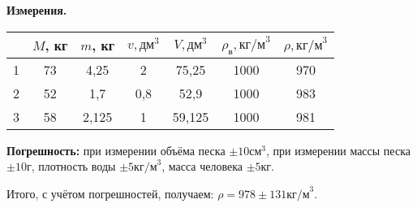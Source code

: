\begin{center}
  \textbf{Измерения.}  
\end{center}
\begin{table}[h]
  \centering
  \label{tbl:bz09_1}
  \begin{tabular}{|c|c|c|c|c|c|c|}
    \hline
    {} & $M$, кг & $m$, кг & $v,\unit{дм}^3$ & $V,\unit{дм}^3$ &
    $\rho_{\text{в}},\unit{кг/м}^3$ & $\rho, \unit{кг/м}^3$ \\
    \hline
    1 & 73 & 4,25 & 2 & 75,25 & 1000 & 970\\
    \hline
    2 & 52 & 1,7 & 0,8 & 52,9 & 1000 & 983\\
    \hline
    3 & 58 & 2,125 & 1 & 59,125 & 1000 & 981\\
    \hline
  \end{tabular}
\end{table}

\textbf{Погрешность:} при измерении объёма песка $\pm 10\unit{см}^3$,
при измерении массы песка $\pm 10 \unit{г}$, плотность воды $\pm 5
\unit{кг/м}^3$, масса человека $\pm 5 \unit{кг}$. 

Итого, с учётом погрешностей, получаем: $\rho=978 \pm 131
\unit{кг/м}^3$. 

